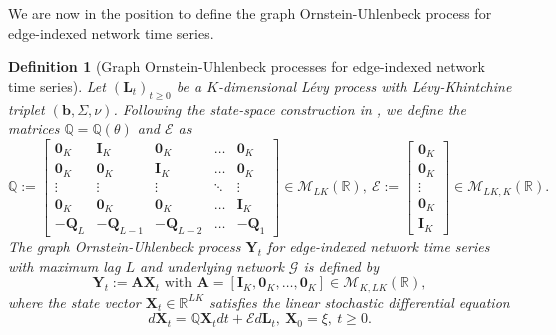 \documentclass[12pt]{amsart}
\newtheorem{definition}{Definition}[section]
\numberwithin{equation}{section}
\newcommand{\R}{\mathbb{R}}
\newcommand{\1}{\mathbf{1}}
\begin{document}
We are now in the position to define the graph Ornstein-Uhlenbeck process for edge-indexed network time series.
\begin{definition}[Graph Ornstein-Uhlenbeck processes for edge-indexed network time series]
\label{groudef}
    Let $(\mathbf{L}_t)_{t\geq 0}$ be a $K$-dimensional L\'evy process with L\'evy-Khintchine triplet $(\mathbf{b},\Sigma, \nu)$. Following the state-space construction in \cite[Lemma 3.8]{marquardt2007multivariate}, we define the matrices $\mathbb{Q}=\mathbb{Q}(\theta)$ and $\mathcal{E}$ as
\begin{equation*}
    \mathbb{Q}:=\begin{bmatrix}
    \mathbf{0}_{K} & \mathbf{I}_{K} & \mathbf{0}_{K} & \dots & \mathbf{0}_{K}\\
    \mathbf{0}_{K} & \mathbf{0}_{K} & \mathbf{I}_{K}  & \dots & \mathbf{0}_{K}\\
    \vdots & \vdots & \vdots & \ddots & \vdots  \\
    \mathbf{0}_{K} & \mathbf{0}_{K} & \mathbf{0}_{K} & \dots & \mathbf{I}_{K}\\
    -\mathbf{Q}_L & -\mathbf{Q}_{L-1} & -\mathbf{Q}_{L-2} & \dots  & -\mathbf{Q}_1
\end{bmatrix}\in \mathcal{M}_{LK}(\mathbb{R}),~\mathcal{E}:=\begin{bmatrix}
    \mathbf{0}_{K}\\
    \mathbf{0}_{K}\\
    \vdots\\
    \mathbf{0}_{K}\\
    \mathbf{I}_{K}
\end{bmatrix}\in \mathcal{M}_{LK,K}(\mathbb{R}).
\end{equation*}
The graph Ornstein-Uhlenbeck process $\mathbf{Y}_t$ for edge-indexed network time series with maximum lag $L$ and underlying network $\mathcal{G}$ is defined by
\begin{equation*}
\mathbf{Y}_t := \mathbf{A}\mathbf{X}_t\text{ with }\mathbf{A}=[\mathbf{I}_{K},\mathbf{0}_{K},\dots,\mathbf{0}_{K}]\in\mathcal{M}_{K,LK}(\mathbb{R}),
\end{equation*}
where the state vector $\mathbf{X}_t\in\R^{LK}$ satisfies the linear stochastic differential equation
\begin{equation}
\label{model2}
d\mathbf{X}_t = \mathbb{Q}\mathbf{X}_tdt + \mathcal{E}d\mathbf{L}_t,~\mathbf{X}_0=\xi, ~t \geq 0.
\end{equation}
\end{definition}
\end{document}
